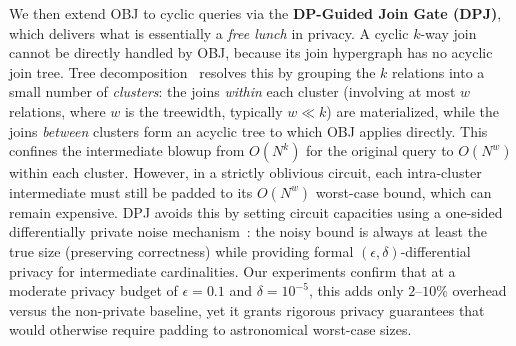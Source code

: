\documentclass[sigconf]{acmart}
\renewcommand{\emph}[1]{\textit{#1}}
\begin{document}
We then extend OBJ to cyclic queries via the \textbf{DP-Guided Join Gate (DPJ)}, which delivers what is essentially a \emph{free lunch} in privacy. A cyclic $k$-way join cannot be directly handled by OBJ, because its join hypergraph has no acyclic join tree. Tree decomposition~\cite{robertson1986graph, gottlob1999hypertree} resolves this by grouping the $k$ relations into a small number of \emph{clusters}: the joins \emph{within} each cluster (involving at most $w$ relations, where $w$ is the treewidth, typically $w \ll k$) are materialized, while the joins \emph{between} clusters form an acyclic tree to which OBJ applies directly. This confines the intermediate blowup from $O(N^k)$ for the original query to $O(N^w)$ within each cluster. However, in a strictly oblivious circuit, each intra-cluster intermediate must still be padded to its $O(N^w)$ worst-case bound, which can remain expensive. DPJ avoids this by setting circuit capacities using a one-sided differentially private noise mechanism~\cite{wang2024special, dwork2014algorithmic}: the noisy bound is always at least the true size (preserving correctness) while providing formal $(\epsilon, \delta)$-differential privacy for intermediate cardinalities. Our experiments confirm that at a moderate privacy budget of $\epsilon = 0.1$ and $\delta = 10^{-5}$, this adds only $2$--$10\%$ overhead versus the non-private baseline, yet it grants rigorous privacy guarantees that would otherwise require padding to astronomical worst-case sizes.

\vspace{-0.1in}
\end{document}
